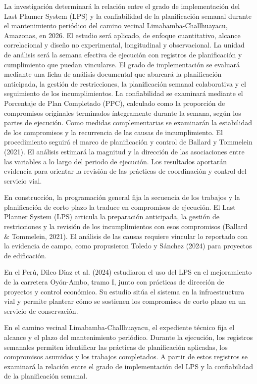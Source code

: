 \documentclass[12pt,a4paper]{article}
\begin{document}
\encabezadoPlan

La investigación determinará la relación entre el grado de implementación del Last Planner System (LPS) y la confiabilidad de la planificación semanal durante el mantenimiento periódico del camino vecinal Limabamba-Challhuayacu, Amazonas, en 2026. El estudio será aplicado, de enfoque cuantitativo, alcance correlacional y diseño no experimental, longitudinal y observacional. La unidad de análisis será la semana efectiva de ejecución con registros de planificación y cumplimiento que puedan vincularse. El grado de implementación se evaluará mediante una ficha de análisis documental que abarcará la planificación anticipada, la gestión de restricciones, la planificación semanal colaborativa y el seguimiento de los incumplimientos. La confiabilidad se examinará mediante el Porcentaje de Plan Completado (PPC), calculado como la proporción de compromisos originales terminados íntegramente durante la semana, según los partes de ejecución. Como medidas complementarias se examinarán la estabilidad de los compromisos y la recurrencia de las causas de incumplimiento. El procedimiento seguirá el marco de planificación y control de Ballard y Tommelein (2021). El análisis estimará la magnitud y la dirección de las asociaciones entre las variables a lo largo del periodo de ejecución. Los resultados aportarán evidencia para orientar la revisión de las prácticas de coordinación y control del servicio vial.

En construcción, la programación general fija la secuencia de los trabajos y la planificación de corto plazo la traduce en compromisos de ejecución. El Last Planner System (LPS) articula la preparación anticipada, la gestión de restricciones y la revisión de los incumplimientos con esos compromisos (Ballard \& Tommelein, 2021). El análisis de las causas requiere vincular lo reportado con la evidencia de campo, como propusieron Toledo y Sánchez (2024) para proyectos de edificación.

En el Perú, Dileo Diaz et al. (2024) estudiaron el uso del LPS en el mejoramiento de la carretera Oyón-Ambo, tramo I, junto con prácticas de dirección de proyectos y control económico. Su estudio sitúa el sistema en la infraestructura vial y permite plantear cómo se sostienen los compromisos de corto plazo en un servicio de conservación.

En el camino vecinal Limabamba-Challhuayacu, el expediente técnico fija el alcance y el plazo del mantenimiento periódico. Durante la ejecución, los registros semanales permiten identificar las prácticas de planificación aplicadas, los compromisos asumidos y los trabajos completados. A partir de estos registros se examinará la relación entre el grado de implementación del LPS y la confiabilidad de la planificación semanal.
\end{document}
